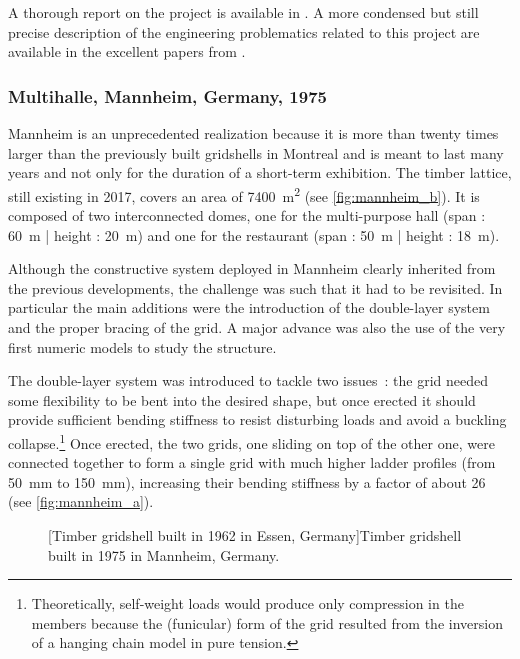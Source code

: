A thorough report on the project is available in \cite{IL13}.  A more condensed but still precise description of the engineering problematics related to this project are available in the excellent papers from \citet{Happold1975, Liddell2015}.

\subsubsection{Multihalle, Mannheim, Germany, 1975}
Mannheim is an unprecedented realization because it is more than twenty times larger than the previously built gridshells in Montreal and is meant to last many years and not only for the duration of a short-term exhibition. The timber lattice, still existing in 2017,  covers an area of \SI{7400}{m^2} (see \cref{fig:mannheim_b}). It is composed of two interconnected domes, one for the multi-purpose hall (span : \SI{60}{m} | height : \SI{20}{m}) and one for the restaurant (span : \SI{50}{m} | height : \SI{18}{m}).

Although the constructive system deployed in Mannheim clearly inherited from the previous developments, the challenge was such that it had to be revisited. In particular the main additions were the introduction of the double-layer system and the proper bracing of the grid. A major advance was also the use of the very first numeric models to study the structure. 

The double-layer system was introduced to tackle two issues~: the grid needed some flexibility to be bent into the desired shape, but once erected it should provide sufficient bending stiffness to resist disturbing loads and avoid a buckling collapse.\footnote{Theoretically, self-weight loads would produce only compression in the members because the (funicular) form of the grid resulted from the inversion of a hanging chain model in pure tension.} Once erected, the two grids, one sliding on top of the other one, were connected together to form a single grid with much higher ladder profiles (from \SI{50}{mm} to \SI{150}{mm}), increasing their bending stiffness by a factor of about 26 (see \cref{fig:mannheim_a}).
\begin{figure}[t]
		\hspace*{\fill}
		\vspace{10pt}
		[Timber gridshell built in 1962 in Essen, Germany]{Timber gridshell built in 1975 in Mannheim, Germany.}
		\label{fig:mannheim}    
\end{figure}

